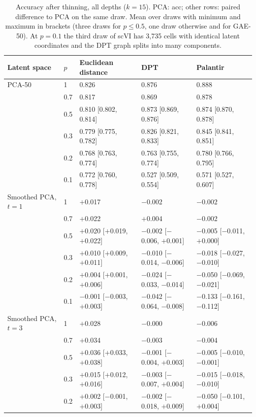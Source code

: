 \documentclass[10pt,a4paper,twocolumn]{article}
\begin{document}
\begin{table}[t]
\centering\scriptsize
\caption{Accuracy after thinning, all depths ($k=15$). PCA: acc; other rows: paired difference to
PCA on the same draw. Mean over draws with minimum and maximum in brackets (three draws for
$p \le 0.5$, one draw otherwise and for GAE-50). At $p=0.1$ the third draw of scVI has 3{,}735
cells with identical latent coordinates and the DPT graph splits into many components.}
\label{tab:thinall}
\setlength{\tabcolsep}{3pt}
\begin{tabular}{lllll}
\toprule
Latent space & $p$ & Euclidean distance & DPT & Palantir \\
\midrule
PCA-50 & 1 & 0.826 & 0.876 & 0.888 \\
 & 0.7 & 0.817 & 0.869 & 0.878 \\
 & 0.5 & 0.810 [0.802, 0.814] & 0.873 [0.869, 0.876] & 0.874 [0.870, 0.878] \\
 & 0.3 & 0.779 [0.775, 0.782] & 0.826 [0.821, 0.833] & 0.845 [0.841, 0.851] \\
 & 0.2 & 0.768 [0.763, 0.774] & 0.763 [0.755, 0.774] & 0.780 [0.766, 0.795] \\
 & 0.1 & 0.772 [0.760, 0.778] & 0.527 [0.509, 0.554] & 0.571 [0.527, 0.607] \\
\midrule
Smoothed PCA, $t=1$ & 1 & $+$0.017 & $-$0.002 & $-$0.002 \\
 & 0.7 & $+$0.022 & $+$0.004 & $-$0.002 \\
 & 0.5 & $+$0.020 [$+$0.019, $+$0.022] & $-$0.002 [$-$0.006, $+$0.001] & $-$0.005 [$-$0.011, $+$0.000] \\
 & 0.3 & $+$0.010 [$+$0.009, $+$0.011] & $-$0.010 [$-$0.014, $-$0.006] & $-$0.018 [$-$0.027, $-$0.010] \\
 & 0.2 & $+$0.004 [$+$0.001, $+$0.006] & $-$0.024 [$-$0.033, $-$0.014] & $-$0.050 [$-$0.069, $-$0.021] \\
 & 0.1 & $-$0.001 [$-$0.003, $+$0.003] & $-$0.042 [$-$0.064, $-$0.008] & $-$0.133 [$-$0.161, $-$0.112] \\
\midrule
Smoothed PCA, $t=3$ & 1 & $+$0.028 & $-$0.000 & $-$0.006 \\
 & 0.7 & $+$0.034 & $-$0.003 & $-$0.004 \\
 & 0.5 & $+$0.036 [$+$0.033, $+$0.038] & $-$0.001 [$-$0.004, $+$0.003] & $-$0.005 [$-$0.010, $-$0.001] \\
 & 0.3 & $+$0.015 [$+$0.012, $+$0.016] & $-$0.003 [$-$0.007, $+$0.004] & $-$0.015 [$-$0.018, $-$0.010] \\
 & 0.2 & $+$0.002 [$-$0.001, $+$0.003] & $-$0.002 [$-$0.018, $+$0.009] & $-$0.050 [$-$0.101, $+$0.004] \\

\end{tabular}
\end{table}
\end{document}
